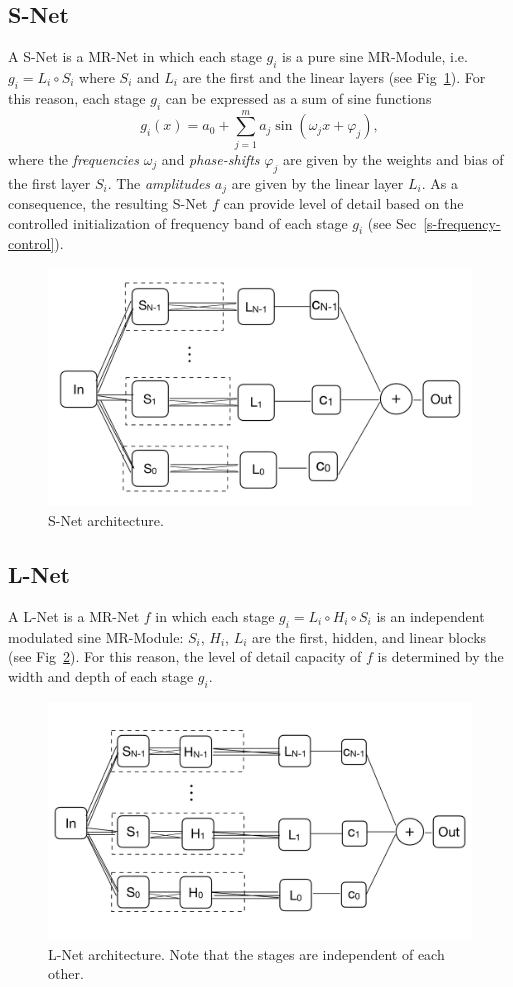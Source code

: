 \subsection{S-Net}

A S-Net is a MR-Net in which each stage $g_i$ is a pure sine MR-Module, i.e. $g_i=L_i\circ S_i$ where $S_i$ and $L_i$ are the first and the linear layers (see Fig~\ref{f:s-net}).
%
For this reason, each stage $g_i$ can be  
expressed as a sum of sine functions
$$g_i(x)=a_0+\sum_{j=1}^m a_j \sin\left(\omega_j x+\varphi_j\right),$$ where the \textit{frequencies} $\omega_j$ and \textit{phase-shifts} $\varphi_j$ are given by the weights and bias of the first layer $S_i$. The \textit{amplitudes} $a_j$ are given by the linear layer $L_i$.
%
As a consequence, the resulting S-Net $f$ can provide level of detail based on the controlled initialization of frequency band of each stage $g_i$ (see Sec~\ref{s-frequency-control}).
\begin{figure}[!h]
\centering
\includegraphics[width=0.58\linewidth]{img/ch4/snet.pdf}
\caption{S-Net architecture.}
\label{f:s-net}
\end{figure}

\subsection{L-Net}
\label{s-lnet}
A L-Net is a MR-Net $f$ in which each stage $g_i=L_i\circ H_i\circ S_i$ is an independent modulated sine MR-Module: $S_i$, $H_i$, $L_i$ are the first, hidden, and linear blocks (see Fig~\ref{f:l-net}).
%
For this reason, the level of detail capacity of $f$ is determined by the width and depth of each stage $g_i$.
\begin{figure}[!h]
\centering
\includegraphics[width=0.7\linewidth]{img/ch4/lnet.pdf}
\caption{L-Net architecture. Note that the stages are independent of each other.}
\label{f:l-net}
\end{figure}


